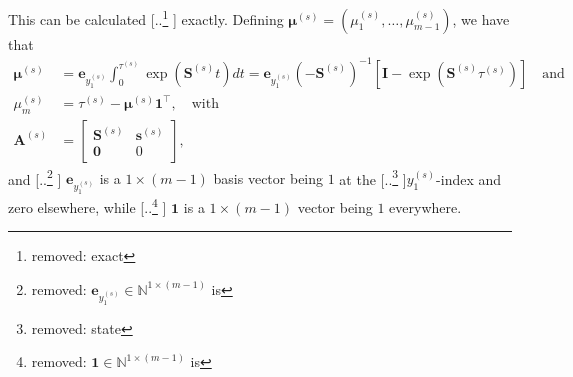 \documentclass{article}
\providecommand{\DIFadd}[1]{{\protect\color{blue} \sf #1}} %
\providecommand{\DIFdel}[1]{{\protect\color{red} [..\footnote{removed: #1} ]}} %
\providecommand{\DIFaddbegin}{} %
\providecommand{\DIFaddend}{} %
\providecommand{\DIFdelbegin}{} %
\providecommand{\DIFdelend}{} %
\begin{document}
This can be calculated \DIFdelbegin \DIFdel{exact}\DIFdelend \DIFaddbegin \DIFadd{exactly}\DIFaddend . Defining $\bm{\mu}^{(s)}  =  \left(\mu_1^{(s)},\dots,\mu_{m-1}^{(s)}\right)$, we have that
\DIFdelbegin %
\DIFdelend \DIFaddbegin \begin{equation}
    \begin{aligned}
\bm{\mu}^{(s)} &= \bm{e}_{y_{1}^{(s)}} \int_0^{\tau^{(s)}}\exp\left(\bm{S}^{(s)}t\right) dt = \bm{e}_{y_{1}^{(s)}} (-\bm{S}^{(s)})^{-1}\left[\bm{I} - \exp \left( \bm{S}^{(s)}\tau^{(s)} \right) \right] \quad \text{and} \\ 
\mu_m^{(s)}  &= \tau^{(s)} - \bm{\mu}^{(s)}\bm{1}^\top, \quad \text{with} \\
\bm{A}^{(s)} &= \left[\begin{array}{cc} \bm{S}^{(s)} & \bm{s}^{(s)}\\
\bm{0} & 0\end{array}\right], 
    \end{aligned} \label{eq:sojourn_time_estimate}
\end{equation}\DIFaddend 
and \DIFdelbegin \DIFdel{$\bm{e}_{y_{1}^{(s)}} \in \mathbb{N}^{1 \times (m-1)}$ is }\DIFdelend \DIFaddbegin \DIFadd{$\bm{e}_{y_{1}^{(s)}}$ is a $1 \times (m-1)$ basis vector being }\DIFaddend $1$ at the \DIFdelbegin \DIFdel{state }\DIFdelend $y_{1}^{(s)}$-index and zero elsewhere, while \DIFdelbegin \DIFdel{$\bm{1} \in \mathbb{N}^{1 \times (m-1)}$ is }\DIFdelend \DIFaddbegin \DIFadd{$\bm{1}$ is a $1 \times (m-1)$ vector being }\DIFaddend $1$ everywhere.
\DIFaddbegin 

\end{document}
